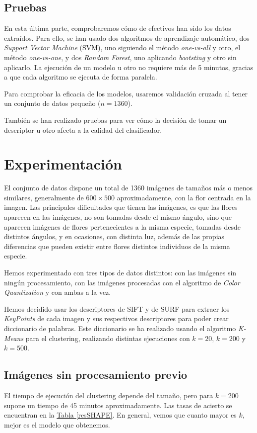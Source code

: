 \documentclass[paper=a4, fontsize=11pt]{article} %
\numberwithin{equation}{section} %
\numberwithin{figure}{section} %
\numberwithin{table}{section} %
\begin{document}
\subsection{Pruebas}

En esta última parte, comprobaremos cómo de efectivos han sido los datos extraídos. Para ello, se han usado dos algoritmos de aprendizaje automático, dos \textit{Support Vector Machine} (SVM), uno siguiendo el método \textit{one-vs-all} y otro, el método \textit{one-vs-one}, y dos \textit{Random Forest}, uno aplicando \textit{bootsting} y otro sin aplicarlo. La ejecución de un modelo u otro no requiere más de 5 minutos, gracias a que cada algoritmo se ejecuta de forma paralela.

Para comprobar la eficacia de los modelos, usaremos validación cruzada al tener un conjunto de datos pequeño ($n=1360$).

También se han realizado pruebas para ver cómo la decisión de tomar un descriptor u otro afecta a la calidad del clasificador.

\section{Experimentación}

El conjunto de datos dispone un total de 1360 imágenes de tamaños más o menos similares, generalmente de $600\times500$ aproximadamente, con la flor centrada en la imagen. Las principales dificultades que tienen las imágenes, es que las flores aparecen en las imágenes, no son tomadas desde el mismo ángulo, sino que aparecen imágenes de flores pertenecientes a la misma especie, tomadas desde distintos ángulos, y en ocasiones, con distinta luz, además de las propias diferencias que pueden existir entre flores distintos individuos de la misma especie.

Hemos experimentado con tres tipos de datos distintos: con las imágenes sin ningún procesamiento, con las imágenes procesadas con el algoritmo de \textit{Color Quantization} y con ambas a la vez.

Hemos decidido usar los descriptores de SIFT y de SURF para extraer los \textit{KeyPoints} de cada imagen y sus respectivos descriptores para poder crear diccionario de palabras. Este diccionario se ha realizado usando el algoritmo \textit{K-Means} para el clustering, realizando distintas ejecuciones con $k=20$, $k=200$ y $k=500$.

\subsection{Imágenes sin procesamiento previo}
El tiempo de ejecución del clustering depende del tamaño, pero para $k=200$ supone un tiempo de 45 minutos aproximadamente. Las tasas de acierto se encuentran en la \hyperref[resSHAPE]{Tabla \ref*{resSHAPE}}. En general, vemos que cuanto mayor es $k$, mejor es el modelo que obtenemos. 
\end{document}
